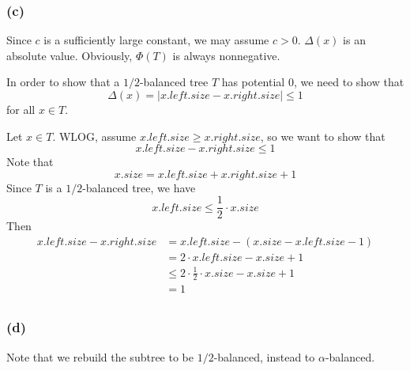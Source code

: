 \subsubsection*{(c)}

Since $c$ is a sufficiently large constant, 
we may assume $c > 0$.
$\Delta(x)$ is an absolute value.
Obviously, $\Phi(T)$ is always nonnegative. 

In order to show that a $1/2$-balanced tree $T$ has potential $0$,
we need to show that 
\begin{equation*}
    \Delta(x) = | x.left.size - x.right.size | \leq 1
\end{equation*}
for all $x \in T$.

Let $x \in T$.
WLOG, assume $x.left.size \geq x.right.size$,
so we want to show that 
\begin{equation*}
    x.left.size - x.right.size \leq 1
\end{equation*}
Note that 
\begin{equation*}
    x.size = x.left.size + x.right.size + 1
\end{equation*}
Since $T$ is a $1/2$-balanced tree,
we have 
\begin{equation*}
    x.left.size \leq \frac{1}{2} \cdot x.size
\end{equation*}
Then
\begin{equation*}
\begin{split}
    x.left.size - x.right.size 
    & = x.left.size - (x.size - x.left.size - 1) \\
    & = 2 \cdot x.left.size - x.size + 1 \\
    & \leq 2 \cdot \frac{1}{2} \cdot x.size - x.size + 1 \\
    & = 1 \\
\end{split}
\end{equation*}

\subsubsection*{(d)}

Note that we rebuild the subtree to be $1/2$-balanced,
instead to $\alpha$-balanced.

